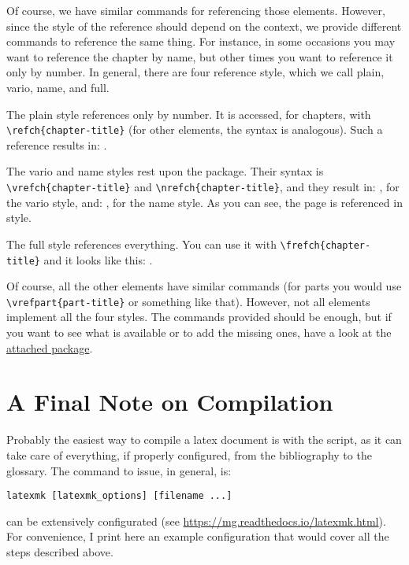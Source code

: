 Of course, we have similar commands for referencing those elements. 
However, since the style of the reference should depend on the context, 
we provide different commands to reference the same thing. For instance, 
in some occasions you may want to reference the chapter by name, but 
other times you want to reference it only by number. In general, there 
are four reference style, which we call plain, vario, name, and full. 

The plain style references only by number. It is accessed, for chapters, 
with \lstinline|\refch{chapter-title}| (for other elements, the syntax 
is analogous). Such a reference results in: .

The vario and name styles rest upon the  package. 
Their syntax is \lstinline|\vrefch{chapter-title}| and 
\lstinline|\nrefch{chapter-title}|, and they result in: 
, for the vario style, and: , for 
the name style. As you can see, the page is referenced in 
 style.

The full style references everything. You can use it with 
\lstinline|\frefch{chapter-title}| and it looks like this: 
.

Of course, all the other elements have similar commands (\eg for parts 
you would use \lstinline|\vrefpart{part-title}| or something like that). 
However, not all elements implement all the four styles. The commands 
provided should be enough, but if you want to see what is available or 
to add the missing ones, have a look at the 
\href{styles/kaorefs.sty}{attached package}.

\section{A Final Note on Compilation}

Probably the easiest way to compile a latex document is with the 
 script, as it can take care of everything, if properly 
configured, from the bibliography to the glossary. The command to issue, 
in general, is:

\begin{lstlisting}
latexmk [latexmk_options] [filename ...]
\end{lstlisting}

 can be extensively configurated (see 
\url{https://mg.readthedocs.io/latexmk.html}). For convenience, I print 
here an example configuration that would cover all the steps described 
above.

